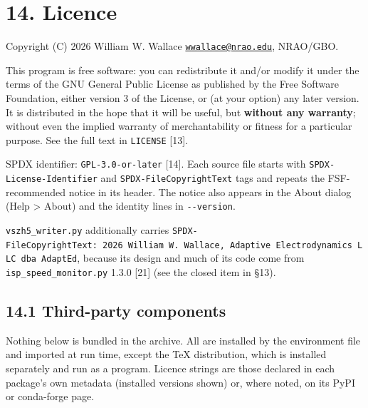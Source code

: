\documentclass[
\directlua{luaotfload.add_fallback("qsfallback", {"DejaVu Sans:mode=harf;", "DejaVu Sans Mono:mode=harf;", "DejaVu Math TeX Gyre:mode=harf;"})}
  10pt,
  letterpaper,
]{article}
\begin{document}
\hypertarget{licence}{%
\section{14. Licence}\label{licence}}

Copyright (C) 2026 William W. Wallace
\href{mailto:wwallace@nrao.edu}{\nolinkurl{wwallace@nrao.edu}},
NRAO/GBO.

This program is free software: you can redistribute it and/or modify it
under the terms of the GNU General Public License as published by the
Free Software Foundation, either version 3 of the License, or (at your
option) any later version. It is distributed in the hope that it will be
useful, but \textbf{without any warranty}; without even the implied
warranty of merchantability or fitness for a particular purpose. See the
full text in \texttt{LICENSE} {[}13{]}.

SPDX identifier: \texttt{GPL-3.0-or-later} {[}14{]}. Each source file
starts with \texttt{SPDX-License-Identifier} and
\texttt{SPDX-FileCopyrightText} tags and repeats the FSF-recommended
notice in its header. The notice also appears in the About dialog (Help
\textgreater{} About) and the identity lines in \texttt{-\/-version}.

\texttt{vszh5\_writer.py} additionally carries
\texttt{SPDX-FileCopyrightText:\ 2026\ William\ W.\ Wallace,\ Adaptive\ Electrodynamics\ LLC\ dba\ AdaptEd},
because its design and much of its code come from
\texttt{isp\_speed\_monitor.py} 1.3.0 {[}21{]} (see the closed item in
§13).

\hypertarget{third-party-components}{%
\subsection{14.1 Third-party components}\label{third-party-components}}

Nothing below is bundled in the archive. All are installed by the
environment file and imported at run time, except the TeX distribution,
which is installed separately and run as a program. Licence strings are
those declared in each package's own metadata (installed versions shown)
or, where noted, on its PyPI or conda-forge page.
\end{document}
